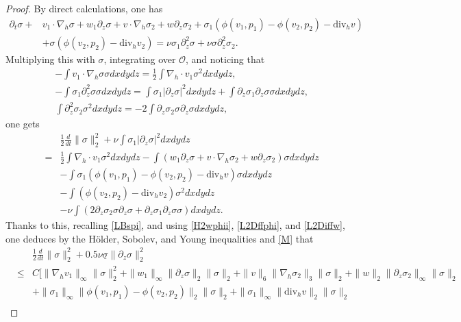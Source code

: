 \documentclass[12pt,reqno]{amsart}
\numberwithin{equation}{section}
\begin{document}
\begin{proof}
  By direct calculations, one has
  \begin{align*}
    \partial_t\sigma+&v_1\cdot\nabla_h\sigma+w_1\partial_z\sigma+v\cdot\nabla_h\sigma_2+w\partial_z\sigma_2+\sigma_1(\phi(v_1,p_1)-\phi(v_2,p_2)
    -\text{div}_hv)\\
    &+\sigma(\phi(v_2,p_2)-\text{div}_h v_2)=\nu\sigma_1\partial_z^2\sigma+\nu\sigma\partial_z^2\sigma_2.
  \end{align*}
  Multiplying this with $\sigma$, integrating over $\mathcal O$, and noticing that
  \begin{eqnarray*}
    &-\int v_1\cdot\nabla_h\sigma\sigma dxdydz=\frac12\int\nabla_h\cdot v_1\sigma^2dxdydz,\\
    &-\int\sigma_1\partial_z^2\sigma\sigma dxdydz=\int\sigma_1|\partial_z\sigma|^2dxdydz+\int\partial_z\sigma_1\partial_z\sigma\sigma dxdydz,\\
    &\int\partial_z^2\sigma_2\sigma^2dxdydz=-2\int\partial_z\sigma_2\sigma\partial_z\sigma dxdydz,
  \end{eqnarray*}
  one gets
  \begin{eqnarray*}
    &&\frac12\frac{d}{dt}\|\sigma\|_2^2+\nu\int\sigma_1|\partial_z\sigma|^2dxdydz\\
    &=&\frac12\int\nabla_h\cdot v_1\sigma^2dxdydz-\int(w_1\partial_z\sigma+v\cdot\nabla_h\sigma_2+w\partial_z\sigma_2)\sigma dxdydz\\
    &&-\int\sigma_1(\phi(v_1,p_1)-\phi(v_2,p_2)-\text{div}_hv)\sigma dxdydz\\
    &&-\int(\phi(v_2,p_2)-\text{div}_hv_2)\sigma^2dxdydz\\
    &&-\nu\int(2\partial_z\sigma_2\sigma\partial_z\sigma+\partial_z\sigma_1\partial_z\sigma\sigma)dxdydz.
  \end{eqnarray*}
  Thanks to this, recalling \eqref{LBspi}, and using \eqref{H2wphii}, \eqref{L2Dffphi}, and \eqref{L2Diffw}, one deduces by the H\"older,
  Sobolev, and Young inequalities and \eqref{M} that
  \begin{eqnarray*}
     &&\frac12\frac{d}{dt}\|\sigma\|_2^2+0.5\nu\underline\sigma\|\partial_z\sigma\|_2^2\\
     &\leq&C[\|\nabla_hv_1\|_\infty\|\sigma\|_2^2+\|w_1\|_\infty\|\partial_z\sigma\|_2\|\sigma\|_2+\|v\|_6\|\nabla_h\sigma_2\|_3\|\sigma\|_2
     +\|w\|_2\|\partial_z\sigma_2\|_\infty\|\sigma\|_2\\
     &&+\|\sigma_1\|_\infty\|\phi(v_1,p_1)-\phi(v_2,p_2)\|_2\|\sigma\|_2+\|\sigma_1\|_\infty\|\text{div}_hv\|_2\|\sigma\|_2
     \\

\end{eqnarray*}
\end{proof}
\end{document}
